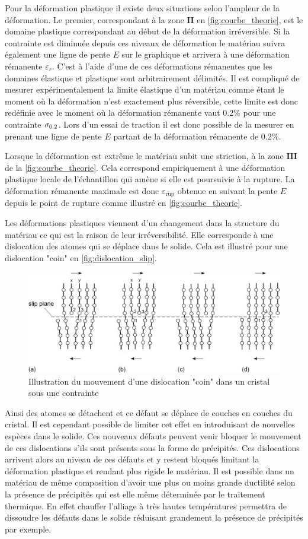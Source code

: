 Pour la déformation plastique il existe deux situations selon l'ampleur de la déformation. Le premier, correspondant à la zone $\mathbf{II}$ en \autoref{fig:courbe_theorie}, est le domaine plastique correspondant au début de la déformation irréversible. Si la contrainte est diminuée depuis ces niveaux de déformation le matériau suivra également une ligne de pente $E$ sur le graphique et arrivera à une déformation rémanente $\varepsilon_r$. C'est à l'aide d'une de ces déformations rémanentes que les domaines élastique et plastique sont arbitrairement délimités. Il est compliqué de mesurer expérimentalement la limite élastique d'un matériau comme étant le moment où la déformation n'est exactement plus réversible, cette limite est donc redéfinie avec le moment où la déformation rémanente vaut 0.2\% pour une contrainte $\sigma_{0.2}$. Lors d'un essai de traction il est donc possible de la mesurer en prenant une ligne de pente $E$ partant de la déformation rémanente de 0.2\%.

Lorsque la déformation est extrême le matériau subit une striction, à la zone $\mathbf{III}$ de la \autoref{fig:courbe_theorie}. Cela correspond empiriquement à une déformation plastique locale de l'échantillon qui amène si elle est poursuivie à la rupture. La déformation rémanente maximale est donc $\varepsilon_\mathrm{rup}$ obtenue en suivant la pente $E$ depuis le point de rupture comme illustré en \autoref{fig:courbe_theorie}.

Les déformations plastiques viennent d'un changement dans la structure du matériau ce qui est la raison de leur irréversibilité. Elle corresponde à une dislocation des atomes qui se déplace dans le solide. Cela est illustré pour une dislocation "coin" en \autoref{fig:dislocation_slip}. 
\begin{figure}[h]
    \centering
    \includegraphics[width=0.8\linewidth]{figures/dislocations_slip.jpg}
    \caption{Illustration du mouvement d'une dislocation "coin" dans un cristal sous une contrainte \cite{manuel}}
    \label{fig:dislocation_slip}
\end{figure}
Ainsi des atomes se détachent et ce défaut se déplace de couches en couches du cristal. Il est cependant possible de limiter cet effet en introduisant de nouvelles espèces dans le solide. Ces nouveaux défauts peuvent venir bloquer le mouvement de ces dislocations s'ils sont présents sous la forme de précipités. Ces dislocations arrivent alors au niveau de ces défauts et y restent bloqués limitant la déformation plastique et rendant plus rigide le matériau. Il est possible dans un matériau de même composition d'avoir une plus ou moins grande ductilité selon la présence de précipités qui est elle même déterminée par le traitement thermique. En effet chauffer l'alliage à très hautes températures permettra de dissoudre les défauts dans le solide réduisant grandement la présence de précipités par exemple.
